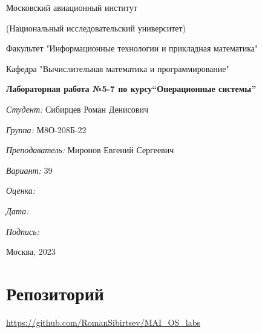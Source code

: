 \documentclass[a4paper, 12pt]{article}
\begin{document}
\thispagestyle{empty}	
\begin{center}
	Московский авиационный институт
	
	(Национальный исследовательский университет)
	
	Факультет "Информационные технологии и прикладная математика"
	
	Кафедра "Вычислительная математика и программирование"
	
\end{center}
\vspace{40ex}
\begin{center}
	\textbf{\large{Лабораторная работа №5-7 по курсу\linebreak \textquotedblleft Операционные системы\textquotedblright}}
\end{center}
\vspace{35ex}
\begin{flushright}
	\textit{Студент: } Сибирцев Роман Денисович
	
	\vspace{2ex}
	\textit{Группа: } М8О-208Б-22
	
	\vspace{2ex}
	\textit{Преподаватель: } Миронов Евгений Сергеевич
	
	\vspace{2ex}
	\textit{Вариант: } 39
	
	\vspace{2ex}
	\textit{Оценка: } \underline{\quad\quad\quad\quad\quad\quad}
	
	 \vspace{2ex}
	\textit{Дата: } \underline{\quad\quad\quad\quad\quad\quad}
	
	\vspace{2ex}
	\textit{Подпись: } \underline{\quad\quad\quad\quad\quad\quad}
	
\end{flushright}

\vspace{5ex}

\begin{vfill}
	\begin{center}
		Москва, 2023
	\end{center}	
\end{vfill}
\newpage

\begingroup
\color{black}
\tableofcontents\newpage
\endgroup

\section{Репозиторий}
\href{https://github.com/RomanSibirtsev/MAI_OS_labs}{https://github.com/RomanSibirtsev/MAI\_OS\_labs}
\end{document}
